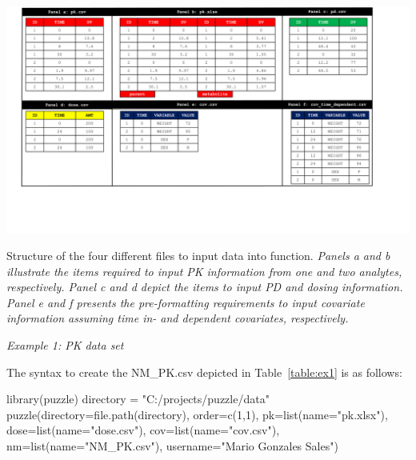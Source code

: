 \begin{widefigure}
  \includegraphics[trim=1.3cm 4cm 1.5cm 0cm,  clip=true, scale=0.6]{Figure1}
  \caption{Structure of the four different files to input data into  function. \textit{Panels a and b illustrate the items required to input PK information from one and two analytes, respectively. Panel c and d depict the items to input PD and dosing information. Panel e and f presents the pre-formatting requirements to input covariate information assuming time in- and dependent covariates, respectively.}}
    \label{figure:fig1}
\end{widefigure}


\newpage

\textit{Example 1: PK data set}

The syntax to create the NM\_PK.csv depicted in Table~\ref{table:ex1} is as follows:
\begin{example}
library(puzzle)
directory = "C:/projects/puzzle/data"
puzzle(directory=file.path(directory),
       order=c(1,1),
       pk=list(name="pk.xlsx"), 
       dose=list(name="dose.csv"), 
       cov=list(name="cov.csv"), 
       nm=list(name="NM_PK.csv"),
       username="Mario Gonzales Sales")
       \end{example}
 
